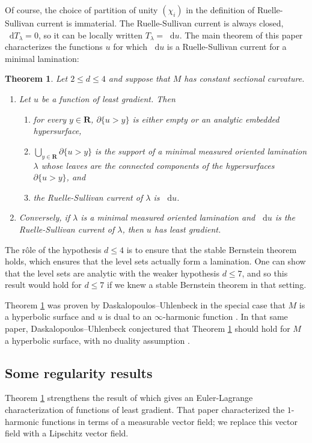\documentclass[reqno,10pt]{amsart}
\newcommand{\RR}{\mathbf{R}}
\newcommand*\dif{\mathop{}\!\mathrm{d}}
\newtheorem{mainthm}{Theorem}
\theoremstyle{definition}
\numberwithin{equation}{section}
\begin{document}
Of course, the choice of partition of unity $(\chi_i)$ in the definition of Ruelle-Sullivan current is immaterial.
The Ruelle-Sullivan current is always closed, $\dif T_\lambda = 0$, so it can be locally written $T_\lambda = \dif u$.
The main theorem of this paper characterizes the functions $u$ for which $\dif u$ is a Ruelle-Sullivan current for a minimal lamination:

\begin{mainthm}\label{main thm}
Let $2 \leq d \leq 4$ and suppose that $M$ has constant sectional curvature.
\begin{enumerate}
\item Let $u$ be a function of least gradient.
Then
\begin{enumerate}
\item for every $y \in \RR$, $\partial \{u > y\}$ is either empty or an analytic embedded hypersurface,
\item $\bigcup_{y \in \RR} \partial \{u > y\}$ is the support of a minimal measured oriented lamination $\lambda$ whose leaves are the connected components of the hypersurfaces $\partial \{u > y\}$, and
\item the Ruelle-Sullivan current of $\lambda$ is $\dif u$.
\end{enumerate}
\item Conversely, if $\lambda$ is a minimal measured oriented lamination and $\dif u$ is the Ruelle-Sullivan current of $\lambda$, then $u$ has least gradient.
\end{enumerate}
\end{mainthm}

The r\^ole of the hypothesis $d \leq 4$ is to ensure that the stable Bernstein theorem \cite{Chodosh2021} holds, which ensures that the level sets actually form a lamination.
One can show that the level sets are analytic with the weaker hypothesis $d \leq 7$, and so this result would hold for $d \leq 7$ if we knew a stable Bernstein theorem in that setting.

Theorem \ref{main thm} was proven by Daskalopoulos--Uhlenbeck in the special case that $M$ is a hyperbolic surface and $u$ is dual to an $\infty$-harmonic function \cite[Theorem 5.2, Theorem 6.10]{daskalopoulos2020transverse}.
In that same paper, Daskalopoulos--Uhlenbeck conjectured that Theorem \ref{main thm} should hold for $M$ a hyperbolic surface, with no duality assumption \cite[Problem 9.4, Conjecture 9.5]{daskalopoulos2020transverse}.

\subsection{Some regularity results}
Theorem \ref{main thm} strengthens the result of \cite{Mazon14} which gives an Euler-Lagrange characterization of functions of least gradient.
That paper characterized the $1$-harmonic functions in terms of a measurable vector field; we replace this vector field with a Lipschitz vector field.
\end{document}
